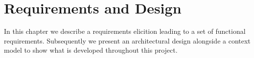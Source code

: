 \chapter{Requirements and Design}
In this chapter we describe a requirements elicition leading to a set of functional requirements.
Subsequently we present an architectural design alongside a context model to show what is developed throughout this project.
